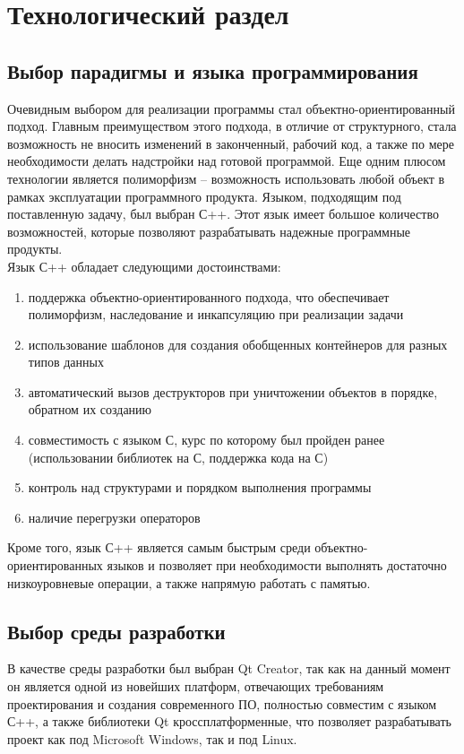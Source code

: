 \chapter{Технологический раздел}
\label{cha:design}

\section{Выбор парадигмы и языка программирования }

Очевидным выбором для реализации программы стал объектно-ориентированный подход. Главным преимуществом этого подхода, в отличие от структурного, стала возможность не вносить изменений в законченный, рабочий код, а также по мере необходимости делать надстройки над готовой программой. Еще одним плюсом технологии является полиморфизм – возможность использовать любой объект в рамках эксплуатации программного продукта.
Языком, подходящим под поставленную задачу, был выбран С++. Этот язык имеет большое количество возможностей, которые позволяют разрабатывать надежные программные продукты. \\
Язык С++ обладает следующими достоинствами:
\begin{enumerate}
	\item	поддержка объектно-ориентированного подхода, что обеспечивает полиморфизм, наследование и инкапсуляцию при реализации задачи
	\item	использование шаблонов для создания обобщенных контейнеров для разных типов данных
	\item	автоматический вызов деструкторов при уничтожении объектов в порядке, обратном их созданию
	\item	совместимость с языком С, курс по которому был пройден ранее (использовании библиотек на С, поддержка кода на С)
	\item	контроль над структурами и порядком выполнения программы
	\item	наличие перегрузки операторов
\end{enumerate}
Кроме того, язык С++ является самым быстрым среди объектно-ориентированных языков и позволяет при необходимости выполнять достаточно низкоуровневые операции, а также напрямую работать с памятью.
\section{Выбор среды разработки }

В качестве среды разработки был выбран Qt Creator, так как на данный момент он является одной из новейших платформ, отвечающих требованиям проектирования и создания современного ПО, полностью совместим с языком С++, а также библиотеки Qt кроссплатформенные, что позволяет разрабатывать проект как под Microsoft Windows, так и под Linux.


